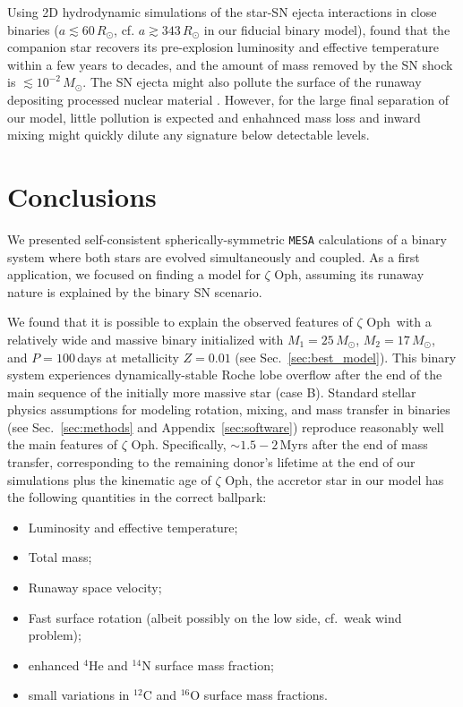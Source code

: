 \documentclass[twocolumn,twocolappendix,trackchanges]{aastex63}
\DeclareRobustCommand{\Secref}[1]{Sec.~\ref{#1}}
\newcommand{\zoph}{$\zeta$ Oph}
\begin{document}
Using 2D hydrodynamic simulations of the star-SN ejecta interactions in close binaries ($a\lesssim
60\,R_\odot$, cf. $a\gtrsim
343\,R_\odot$ in our fiducial binary model), \cite{hirai:18} found that the companion star recovers its pre-explosion luminosity and effective temperature within a few years to decades, and the amount of mass removed by the SN shock is
$\lesssim10^{-2}\,M_\odot$.  The SN ejecta might also pollute the surface of the runaway depositing processed nuclear material \citep[e.g.,][]{przybilla:08, suda:21}. However, for the large final separation of our model, little pollution is expected and enhahnced mass loss and inward mixing might quickly dilute any signature below detectable levels.


\section{Conclusions}
\label{sec:conclusions}

We presented self-consistent spherically-symmetric \texttt{MESA}
calculations of a binary system where both stars are evolved
simultaneously and coupled. As a first application, we focused on
finding a model for \zoph, assuming its runaway nature is explained by
the binary SN scenario.

We found that it is possible to explain the observed features of
\zoph\ with a relatively wide and massive binary initialized with
$M_1=25\,M_\odot$, $M_2=17\,M_\odot$, and $P=100$\,days at metallicity
$Z=0.01$ (see \Secref{sec:best_model}). This binary system experiences dynamically-stable Roche
lobe overflow after the end of the main sequence of the initially more massive star
(case B). Standard stellar physics assumptions for modeling rotation,
mixing, and mass transfer in binaries (see \Secref{sec:methods} and
Appendix~\ref{sec:software}) reproduce reasonably well the
main features of \zoph. Specifically,
$\sim$$1.5-2$\,Myrs after the end of mass transfer, corresponding to the
remaining donor's lifetime at the end of our simulations plus the kinematic age of \zoph,
the accretor star in our model has the following quantities in the correct ballpark:
\begin{itemize}
\item Luminosity and effective temperature;
\item Total mass;
\item Runaway space velocity;
\item Fast surface rotation (albeit possibly on the low side, cf.~weak wind problem);
\item enhanced $^4\mathrm{He}$ and $^{14}\mathrm{N}$ surface mass fraction;
\item small variations in $^{12}\mathrm{C}$ and $^{16}\mathrm{O}$ surface mass fractions.
\end{itemize}
\end{document}
